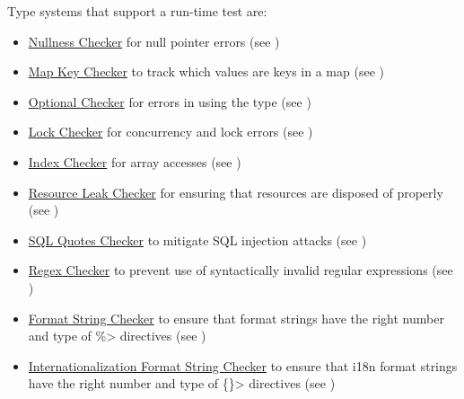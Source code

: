 
Type systems that support a run-time test are:
\begin{itemize}
\item
  \hyperref[nullness-checker]{Nullness Checker} for null pointer errors
  (see )
\item
  \hyperref[map-key-checker]{Map Key Checker} to track which values are
  keys in a map (see )
\item
  \hyperref[optional-checker]{Optional Checker} for errors in using the
   type (see
  )
\item
  \hyperref[lock-checker]{Lock Checker} for concurrency and lock errors
  (see )
\item
  \hyperref[index-checker]{Index Checker} for array accesses
  (see )
\item
  \hyperref[resource-leak-checker]{Resource Leak Checker} for ensuring that resources are disposed of properly
  (see )
\item
  \hyperref[sql-quotes-checker]{SQL Quotes Checker} to mitigate SQL injection
  attacks
  (see )
\item
  \hyperref[regex-checker]{Regex Checker} to prevent use of syntactically
  invalid regular expressions (see )
\item
  \hyperref[formatter-checker]{Format String Checker} to ensure that format
  strings have the right number and type of \<\%> directives (see
  )
\item
  \hyperref[i18n-formatter-checker]{Internationalization Format String Checker}
  to ensure that i18n format strings have the right number and type of
  \<\{\}> directives (see )
\end{itemize}


